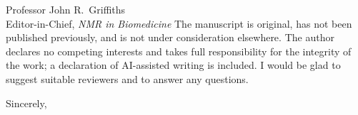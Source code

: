 \documentclass[11pt]{letter}
\begin{document}
\begin{letter}{Professor John R.\ Griffiths \\ Editor-in-Chief, \textit{NMR in Biomedicine}}
The manuscript is original, has not been published previously, and is not under
consideration elsewhere. The author declares no competing interests and takes full
responsibility for the integrity of the work; a declaration of AI-assisted writing is
included. I would be glad to suggest suitable reviewers and to answer any questions.

\closing{Sincerely,}

\end{letter}
\end{document}
